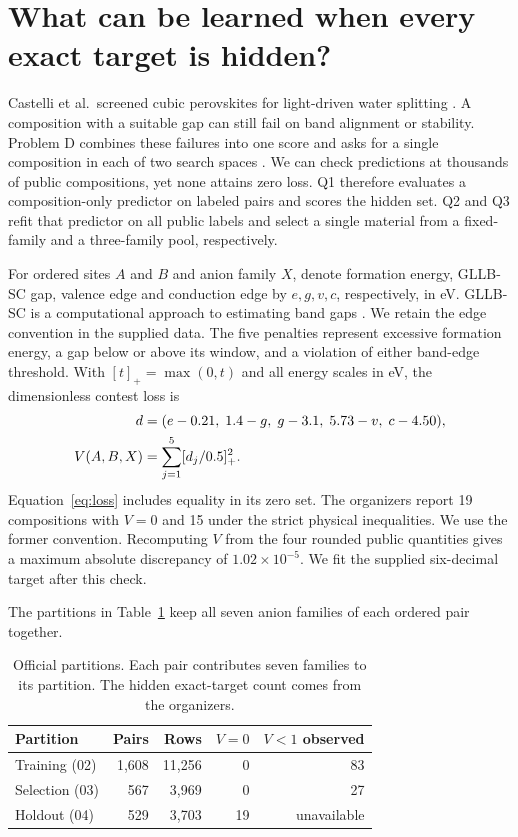 \section{What can be learned when every exact target is hidden?}
Castelli et al.\ screened cubic perovskites for light-driven water splitting \cite{castelli}. A composition with a suitable gap can still fail on band alignment or stability. Problem D combines these failures into one score and asks for a single composition in each of two search spaces \cite{contest}. We can check predictions at thousands of public compositions, yet none attains zero loss. Q1 therefore evaluates a composition-only predictor on labeled pairs and scores the hidden set. Q2 and Q3 refit that predictor on all public labels and select a single material from a fixed-family and a three-family pool, respectively.

For ordered sites $A$ and $B$ and anion family $X$, denote formation energy, GLLB-SC gap, valence edge and conduction edge by $e,g,v,c$, respectively, in eV. GLLB-SC is a computational approach to estimating band gaps \cite{kuisma}. We retain the edge convention in the supplied data. The five penalties represent excessive formation energy, a gap below or above its window, and a violation of either band-edge threshold. With $[t]_+=\max(0,t)$ and all energy scales in eV, the dimensionless contest loss is
\begin{align}
 d&=(e-0.21,\;1.4-g,\;g-3.1,\;5.73-v,\;c-4.50),\notag\\
 V(A,B,X)&=\sum_{j=1}^5 [d_j/0.5]_+^2. \label{eq:loss}
\end{align}
Equation~\eqref{eq:loss} includes equality in its zero set. The organizers report 19 compositions with $V=0$ and 15 under the strict physical inequalities. We use the former convention. Recomputing $V$ from the four rounded public quantities gives a maximum absolute discrepancy of $1.02\times10^{-5}$. We fit the supplied six-decimal target after this check.

The partitions in Table~\ref{tab:data} keep all seven anion families of each ordered pair together.

\begin{table}[htbp]
\caption{Official partitions. Each pair contributes seven families to its partition. The hidden exact-target count comes from the organizers.}\label{tab:data}
\centering\begin{tabular}{lrrrr}
\toprule Partition & Pairs & Rows & $V=0$ & $V<1$ observed\\\midrule
Training (02) & 1,608 & 11,256 & 0 & 83\\
Selection (03) & 567 & 3,969 & 0 & 27\\
Holdout (04) & 529 & 3,703 & 19 & unavailable\\\bottomrule
\end{tabular}
\end{table}

